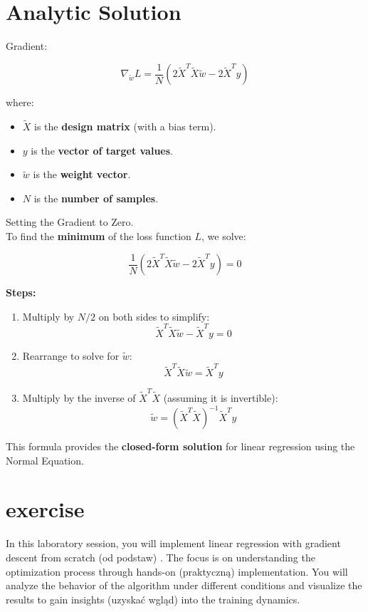 \documentclass{article}
\begin{document}
\section{Analytic Solution}

Gradient:

\[
\nabla_{\tilde{w}} L = \frac{1}{N} \left( 2 \tilde{X}^T \tilde{X} \tilde{w} - 2 \tilde{X}^T y \right)
\]

where:
\begin{itemize}
    \item \( \tilde{X} \) is the \textbf{design matrix} (with a bias term).
    \item \( y \) is the \textbf{vector of target values}.
    \item \( \tilde{w} \) is the \textbf{weight vector}.
    \item \( N \) is the \textbf{number of samples}.
\end{itemize}
Setting the Gradient to Zero.\\
To find the \textbf{minimum} of the loss function \( L \), we solve:

\[
\frac{1}{N} \left( 2 \tilde{X}^T \tilde{X} \tilde{w} - 2 \tilde{X}^T y \right) = 0
\]

\textbf{Steps:}
\begin{enumerate}
    \item Multiply by \( N/2 \) on both sides to simplify:
    \[
    \tilde{X}^T \tilde{X} \tilde{w} - \tilde{X}^T y = 0
    \]
    
    \item Rearrange to solve for \( \tilde{w} \):
    \[
    \tilde{X}^T \tilde{X} \tilde{w} = \tilde{X}^T y
    \]

    \item Multiply by the inverse of \( \tilde{X}^T \tilde{X} \) (assuming it is invertible):
    \[
    \tilde{w} = (\tilde{X}^T \tilde{X})^{-1} \tilde{X}^T y
    \]
\end{enumerate}

This formula provides the \textbf{closed-form solution} for linear regression using the Normal Equation.

\newpage
\section{exercise}
In this laboratory session, you will implement linear regression with gradient descent from scratch (od podstaw) . The focus is on understanding the optimization process through hands-on (praktyczną) implementation. You will analyze the behavior of the algorithm under different conditions and visualize the results to gain insights (uzyskać wgląd) into the training dynamics.
\end{document}
